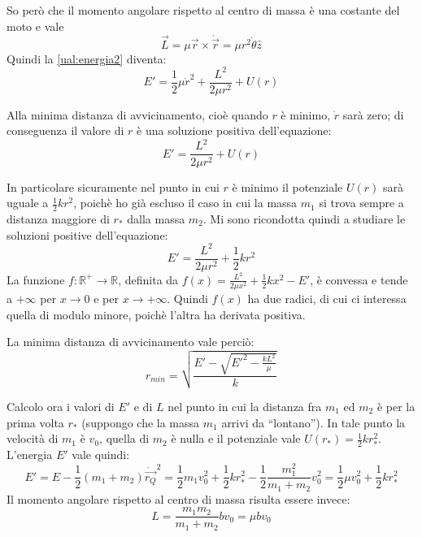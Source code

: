\documentclass[../main.tex]{subfiles}
\begin{document}
So però che il momento angolare rispetto al centro di massa è una costante del moto e vale 
\begin{equation*}
	\vec L=\mu \vec r \times \dot {\vec r}=\mu r^2\dot\theta \hat z
\end{equation*}
Quindi la \cref{ual:energia2} diventa:
\begin{equation*}
	E'=\frac12\mu\dot r^2+\frac{L^2}{2\mu r^2}+U(r)
\end{equation*}

Alla minima distanza di avvicinamento, cioè quando $r$ è minimo, $\dot{r}$ sarà zero; di conseguenza il valore di $r$ è una soluzione positiva dell'equazione:
\begin{equation*}
	E'=\frac{L^2}{2\mu r^2}+U(r)
\end{equation*}

In particolare sicuramente nel punto in cui $r$ è minimo il potenziale $U(r)$ sarà uguale a $\frac12kr^2$, poichè ho già escluso il caso in cui la massa $m_1$ si trova sempre a distanza maggiore di $r_*$ dalla massa $m_2$. Mi sono ricondotta quindi a studiare le soluzioni positive dell'equazione:
\begin{equation*}
	E'=\frac{L^2}{2\mu r^2}+\frac12kr^2
\end{equation*}
La funzione $f:\mathbb{R^+}\to\mathbb{R}$, definita da $f(x)=\frac{L^2}{2\mu x^2}+\frac12kx^2-E'$, è convessa e tende a $+\infty$ per $x\to 0$ e per $x\to +\infty$. Quindi $f(x)$ ha due radici, di cui ci interessa quella di modulo minore, poichè l'altra ha derivata positiva.
 
La minima distanza di avvicinamento vale perciò:
\begin{equation}\label{ual:sol}
	r_{min}=\sqrt{ \frac{E'- \sqrt{E'^2-\frac{kL^2}{\mu}}}{k} }
\end{equation}

Calcolo ora i valori di $E'$ e di $L$ nel punto in cui la distanza fra $m_1$ ed $m_2$ è per la prima volta $r_*$ (suppongo che la massa $m_1$ arrivi da ``lontano''). In tale punto la velocità di $m_1$ è $v_0$, quella di $m_2$ è nulla e il potenziale vale $U(r_*)=\frac12kr_*^2$. L'energia $E'$ vale quindi:
\begin{equation}\label{ual:valEnergia}
	E'=E-\frac12(m_1+m_2)\dot{\overrightarrow{r_Q}}^2=\frac12m_1v_0^2+\frac12kr_*^2-\frac12 \frac{m_1^2}{m_1+m_2}v_0^2=\frac12 \mu v_0^2+\frac12 kr_*^2
\end{equation}
Il momento angolare rispetto al centro di massa risulta essere invece:
\begin{equation}\label{ual:valMomento}
	L=\frac{m_1m_2}{m_1+m_2}bv_0=\mu bv_0
\end{equation}
\end{document}
